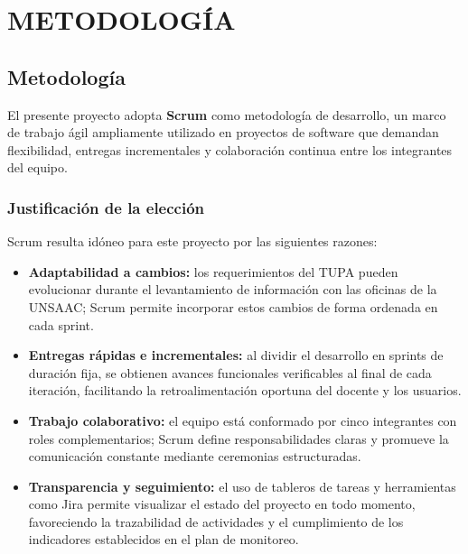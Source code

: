 \newpage
\chapter{METODOLOGÍA}

\section{Metodología}

El presente proyecto adopta \textbf{Scrum} como metodología de desarrollo, un marco de
trabajo ágil ampliamente utilizado en proyectos de software que demandan flexibilidad,
entregas incrementales y colaboración continua entre los integrantes del equipo.

\subsection{Justificación de la elección}

Scrum resulta idóneo para este proyecto por las siguientes razones:

\begin{itemize}
    \item \textbf{Adaptabilidad a cambios:} los requerimientos del TUPA pueden evolucionar
            durante el levantamiento de información con las oficinas de la UNSAAC; Scrum
            permite incorporar estos cambios de forma ordenada en cada sprint.
    \item \textbf{Entregas rápidas e incrementales:} al dividir el desarrollo en sprints de
            duración fija, se obtienen avances funcionales verificables al final de cada
            iteración, facilitando la retroalimentación oportuna del docente y los usuarios.
    \item \textbf{Trabajo colaborativo:} el equipo está conformado por cinco integrantes con
            roles complementarios; Scrum define responsabilidades claras y promueve la
            comunicación constante mediante ceremonias estructuradas.
    \item \textbf{Transparencia y seguimiento:} el uso de tableros de tareas y herramientas
            como Jira permite visualizar el estado del proyecto en todo momento, favoreciendo
            la trazabilidad de actividades y el cumplimiento de los indicadores establecidos
            en el plan de monitoreo.
\end{itemize}

